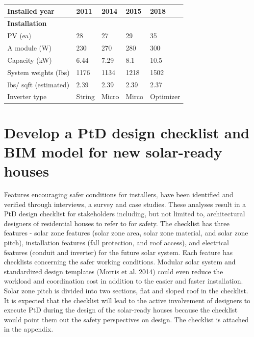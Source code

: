 \documentclass[]{article}
\begin{document}
\begin{table}[t]
\begin{tabular}{l|l|l|l|l}
\hline
\hspace{1em}Installed year & 2011 & 2014 & 2015 & 2018\\
\hline
\multicolumn{5}{l}{\textbf{Installation}}\\
\hline
\hspace{1em}PV (ea) & 28 & 27 & 29 & 35\\
\hline
\hspace{1em}A module (W) & 230 & 270 & 280 & 300\\
\hline
\hspace{1em}Capacity (kW) & 6.44 & 7.29 & 8.1 & 10.5\\
\hline
\hspace{1em}System weights (lbs) & 1176 & 1134 & 1218 & 1502\\
\hline
\hspace{1em}lbs/ sqft (estimated) & 2.39 & 2.39 & 2.39 & 2.37\\
\hline
\hspace{1em}Inverter type & String & Micro & Mirco & Optimizer\\
\hline
\end{tabular}
\end{table}

\hypertarget{develop-a-ptd-design-checklist-and-bim-model-for-new-solar-ready-houses}{%
\section{Develop a PtD design checklist and BIM model for new
solar-ready
houses}\label{develop-a-ptd-design-checklist-and-bim-model-for-new-solar-ready-houses}}

Features encouraging safer conditions for installers, have been
identified and verified through interviews, a survey and case studies.
These analyses result in a PtD design checklist for stakeholders
including, but not limited to, architectural designers of residential
houses to refer to for safety. The checklist has three features - solar
zone features (solar zone area, solar zone material, and solar zone
pitch), installation features (fall protection, and roof access), and
electrical features (conduit and inverter) for the future solar system.
Each feature has checklists concerning the safer working conditions.
Modular solar system and standardized design templates (Morris et al.
2014) could even reduce the workload and coordination cost in addition
to the easier and faster installation. Solar zone pitch is divided into
two sections, flat and sloped roof in the checklist. It is expected that
the checklist will lead to the active involvement of designers to
execute PtD during the design of the solar-ready houses because the
checklist would point them out the safety perspectives on design. The
checklist is attached in the appendix.
\end{document}
